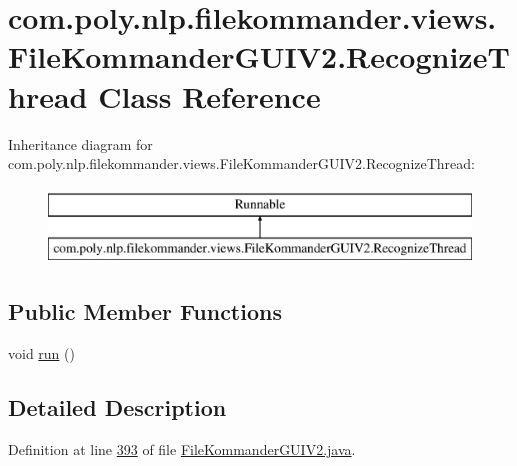 \hypertarget{classcom_1_1poly_1_1nlp_1_1filekommander_1_1views_1_1_file_kommander_g_u_i_v2_1_1_recognize_thread}{\section{com.\-poly.\-nlp.\-filekommander.\-views.\-File\-Kommander\-G\-U\-I\-V2.\-Recognize\-Thread Class Reference}
\label{classcom_1_1poly_1_1nlp_1_1filekommander_1_1views_1_1_file_kommander_g_u_i_v2_1_1_recognize_thread}
}
Inheritance diagram for com.\-poly.\-nlp.\-filekommander.\-views.\-File\-Kommander\-G\-U\-I\-V2.\-Recognize\-Thread\-:\begin{figure}[H]
\begin{center}
\leavevmode
\includegraphics[height=2.000000cm]{classcom_1_1poly_1_1nlp_1_1filekommander_1_1views_1_1_file_kommander_g_u_i_v2_1_1_recognize_thread}
\end{center}
\end{figure}
\subsection*{Public Member Functions}
\begin{DoxyCompactItemize}
\item 
void \hyperlink{classcom_1_1poly_1_1nlp_1_1filekommander_1_1views_1_1_file_kommander_g_u_i_v2_1_1_recognize_thread_a4be07d48ad5b312798cd85d092a56d5f}{run} ()
\end{DoxyCompactItemize}


\subsection{Detailed Description}


Definition at line \hyperlink{L393}{393} of file \hyperlink{}{File\-Kommander\-G\-U\-I\-V2.\-java}.



